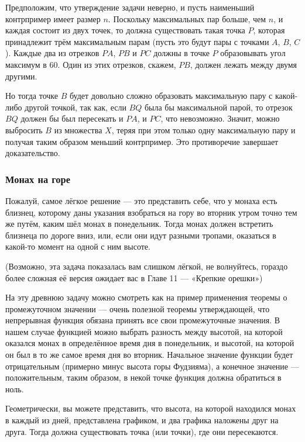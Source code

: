 Предположим, что утверждение задачи неверно, и пусть наименьший контрпример имеет размер $n$.
Поскольку максимальных пар больше, чем $n$, и каждая состоит из двух точек, то должна существовать такая точка $P$, которая принадлежит трём максимальным парам (пусть это будут пары с точками $A$, $B$, $C$).
Каждые два из отрезков $PA$, $PB$ и $PC$ должны в точке $P$ образовывать угол максимум в 60\degree.
Один из этих отрезков, скажем, $PB$, %
должен лежать между двумя другими.

Но тогда точке $B$ будет довольно сложно образовать максимальную пару с какой-либо другой точкой, так как, если $BQ$ была бы максимальной парой, то отрезок $BQ$ должен бы был пересекать и $PA$, и $PC$, что невозможно.
Значит, можно выбросить $B$ из множества $X$, теряя при этом только одну максимальную пару и получая таким образом меньший контрпример.
Это противоречие завершает доказательство.\heart

\subsubsection*{Монах на горе}%

Пожалуй, самое лёгкое решение --- это представить себе, что у монаха есть близнец, которому даны указания взобраться на гору во вторник утром точно тем же путём, каким шёл монах в понедельник.
Тогда монах должен встретить близнеца по дороге вниз, или, если они идут разными тропами, оказаться в какой-то момент на одной с ним высоте.\heart

(Возможно, эта задача показалась вам слишком лёгкой, не волнуйтесь, гораздо более сложная её версия ожидает вас в Главе 11 --- «Крепкие орешки»)

На эту древнюю задачу можно смотреть как на пример применения теоремы о промежуточном значении --- очень полезной теоремы утверждающей, что непрерывная функция обязана принять все свои промежуточные значения.
В нашем случае функцией можно выбрать разность между высотой, на которой оказался монах в определённое время дня в понедельник, и высотой, на которой он был в то же самое время дня во вторник.
Начальное значение функции будет отрицательным (примерно минус высота горы Фудзияма), а конечное значение --- положительным, таким образом, в некой точке функция должна обратиться в ноль.

Геометрически, вы можете представить, что высота, на которой находился монах в каждый из дней, представлена графиком, и два графика наложены друг на друга.
Тогда должна существовать точка (или точки), где они пересекаются.

